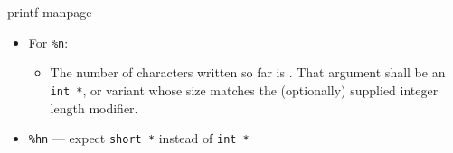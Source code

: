 
\begin{frame}{printf manpage}
    \begin{itemize}
        \item For {\tt \%n}:
        \begin{itemize}
            \item The  number  of  characters  written so far is .  That argument shall be an {\tt int *}, or variant whose size  matches
              the  (optionally)  supplied  integer  length  modifier. 
        \end{itemize}
    \item<2> {\tt \%hn} --- expect {\tt short *} instead of {\tt int *}
    \end{itemize}
\end{frame}

